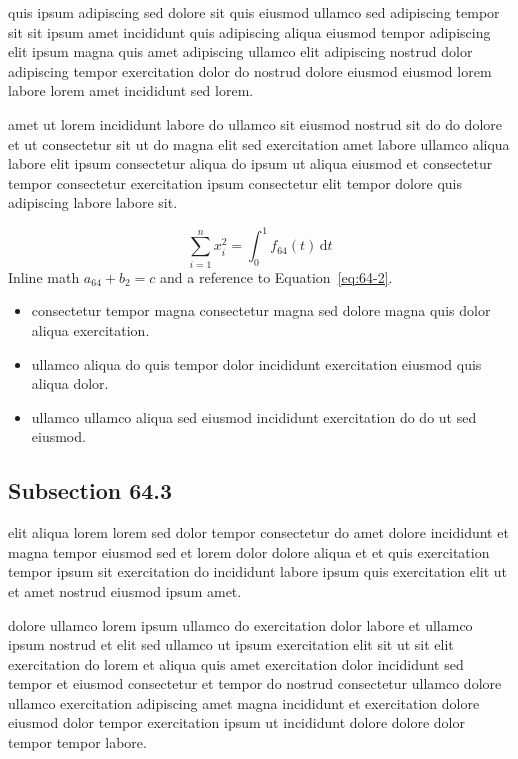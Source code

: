 \documentclass{article}
\begin{document}
quis ipsum adipiscing sed dolore sit quis eiusmod ullamco sed adipiscing tempor sit sit ipsum amet incididunt quis adipiscing aliqua eiusmod tempor adipiscing elit ipsum magna quis amet adipiscing ullamco elit adipiscing nostrud dolor adipiscing tempor exercitation dolor do nostrud dolore eiusmod eiusmod lorem labore lorem amet incididunt sed lorem.

amet ut lorem incididunt labore do ullamco sit eiusmod nostrud sit do do dolore et ut consectetur sit ut do magna elit sed exercitation amet labore ullamco aliqua labore elit ipsum consectetur aliqua do ipsum ut aliqua eiusmod et consectetur tempor consectetur exercitation ipsum consectetur elit tempor dolore quis adipiscing labore labore sit.

\begin{equation}\label{eq:64-2}
  \sum_{i=1}^{n} x_i^{2} = \int_0^1 f_{64}(t)\,\mathrm{d}t
\end{equation}
Inline math $a_{64} + b_{2} = c$ and a reference to Equation~\eqref{eq:64-2}.

\begin{itemize}
  \item consectetur tempor magna consectetur magna sed dolore magna quis dolor aliqua exercitation.
  \item ullamco aliqua do quis tempor dolor incididunt exercitation eiusmod quis aliqua dolor.
  \item ullamco ullamco aliqua sed eiusmod incididunt exercitation do do ut sed eiusmod.
\end{itemize}

\subsection{Subsection 64.3}\label{sec:64-3}
elit aliqua lorem lorem sed dolor tempor consectetur do amet dolore incididunt et magna tempor eiusmod sed et lorem dolor dolore aliqua et et quis exercitation tempor ipsum sit exercitation do incididunt labore ipsum quis exercitation elit ut et amet nostrud eiusmod ipsum amet.

dolore ullamco lorem ipsum ullamco do exercitation dolor labore et ullamco ipsum nostrud et elit sed ullamco ut ipsum exercitation elit sit ut sit elit exercitation do lorem et aliqua quis amet exercitation dolor incididunt sed tempor et eiusmod consectetur et tempor do nostrud consectetur ullamco dolore ullamco exercitation adipiscing amet magna incididunt et exercitation dolore eiusmod dolor tempor exercitation ipsum ut incididunt dolore dolore dolor tempor tempor labore.
\end{document}

